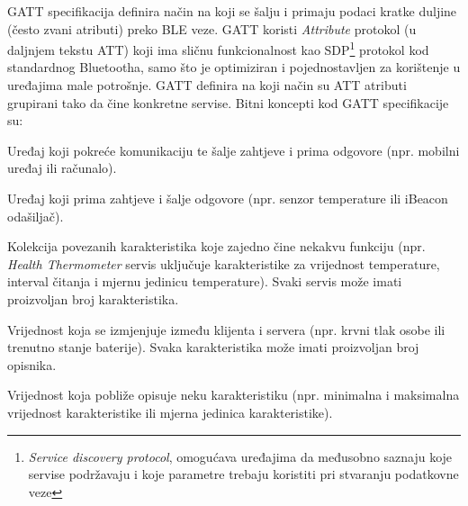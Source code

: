GATT specifikacija definira način na koji se šalju i primaju podaci kratke duljine (često zvani atributi) preko BLE veze. 
GATT koristi \textit{Attribute} protokol (u daljnjem tekstu ATT) koji ima sličnu funkcionalnost kao SDP\footnote{\textit{Service discovery protocol}, omogućava uređajima da međusobno saznaju koje servise podržavaju i koje parametre trebaju koristiti pri stvaranju podatkovne veze} protokol kod standardnog Bluetootha, samo što je optimiziran i pojednostavljen za korištenje u uređajima male potrošnje. 
GATT definira na koji način su ATT atributi grupirani tako da čine konkretne servise. 
Bitni koncepti kod GATT specifikacije su:
\begin{description}[style=nextline]
    \item[Klijent] 
        Uređaj koji pokreće komunikaciju te šalje zahtjeve i prima odgovore (npr. mobilni uređaj ili računalo).
    \item[Server] 
        Uređaj koji prima zahtjeve i šalje odgovore (npr. senzor temperature ili iBeacon odašiljač).
    \item[Servis] 
        Kolekcija povezanih karakteristika koje zajedno čine nekakvu funkciju (npr. \textit{Health Thermometer} servis uključuje                     karakteristike za vrijednost temperature, interval čitanja i mjernu jedinicu temperature). 
        Svaki servis može imati proizvoljan broj karakteristika.
    \item[Karakteristika\footnote{engl. \textit{Characteristic}}] 
        Vrijednost koja se izmjenjuje između klijenta i servera (npr. krvni tlak osobe ili trenutno stanje baterije). 
        Svaka karakteristika može imati proizvoljan broj opisnika.
    \item[Opisnik\footnote{engl. \textit{Descriptor}}] 
        Vrijednost koja pobliže opisuje neku karakteristiku (npr. minimalna i maksimalna vrijednost karakteristike ili mjerna jedinica karakteristike).
\end{description}